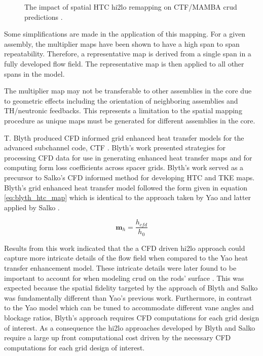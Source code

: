 \begin{figure}[H]%
    \centering
    \qquad
    \caption[The impact of spatial HTC hi2lo remapping on CTF/MAMBA crud predictions.]{The impact of spatial HTC hi2lo remapping on CTF/MAMBA crud predictions \cite{salko17}.}%
    \label{fig:htc_remap_crud}%
\end{figure}


Some simplifications are made in the application of this mapping.  For a given assembly, the multiplier maps have been shown to have a high span to span repeatability.  Therefore, a representative map is derived from a single span in a fully developed flow field.  The representative map is then applied to all other spans in the model.

The multiplier map may not be transferable to other assemblies in the core due to geometric effects including the orientation of neighboring assemblies and TH/neutronic feedbacks.  This represents a limitation to the spatial mapping procedure as unique maps must be generated for different assemblies in the core.

T. Blyth produced CFD informed grid enhanced heat transfer models for the advanced subchannel code, CTF \cite{blyth2014} \cite{blyth2017}.  Blyth's work presented strategies for processing CFD data for use in generating enhanced heat transfer maps and for computing form loss coefficients across spacer grids.  Blyth's work served as a precursor to Salko's CFD informed method for developing HTC and TKE maps.  Blyth's grid enhanced heat transfer model followed the form given in equation \ref{eq:blyth_htc_map} which is identical to the approach taken by Yao and latter applied by Salko \cite{yao82} \cite{salko17}.

\begin{equation}
\mathbf m_h = \frac{h_{cfd}}{h_0}
\label{eq:blyth_htc_map}
\end{equation}

Results from this work indicated that the a CFD driven hi2lo approach could capture more intricate details of the flow field when compared to the Yao heat transfer enhancement model.  These intricate details were later found to be important to account for when modeling crud on the rods' surface \cite{slattery16}.   This was expected because the spatial fidelity targeted by the approach of Blyth and Salko was fundamentally different than Yao's previous work.  Furthermore, in contrast to the Yao model which can be tuned to accommodate different vane angles and blockage ratios,  Blyth's approach requires CFD computations for each grid design of interest. 
As a consequence the hi2lo approaches developed by Blyth and Salko require a large up front computational cost driven by the necessary CFD computations for each grid design of interest.

